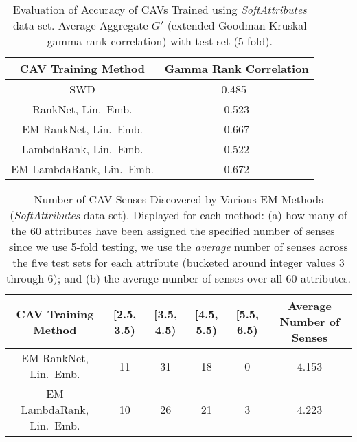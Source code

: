 \documentclass[manuscript,screen,nonacm]{acmart}
\newcommand{\1}{{\mathbf 1}}
\theoremstyle{TheoremNum}
\begin{document}
\begin{table}[t]
    \centering
\begin{tabular}{|c||c|}
\hline
CAV Training Method & Gamma Rank Correlation \\ \hline\hline
SWD & 0.485~\cite{sigir21:filipandkristian} \\ \hline     
RankNet, Lin.\ Emb. & 0.523 \\ \hline
EM RankNet, Lin.\ Emb. & 0.667 \\ \hline
LambdaRank, Lin.\ Emb. & 0.522 \\ \hline     
EM LambdaRank, Lin.\ Emb. & 0.672 \\ \hline     
\end{tabular}
\vspace*{2mm}
   \caption{Evaluation of Accuracy of CAVs Trained using \emph{SoftAttributes} data set. Average Aggregate $G'$ (extended Goodman-Kruskal gamma rank correlation) with test set (5-fold).}
   \label{tab:training_with_softattributes}
\end{table}

\begin{table}[t]
\begin{tabular}{|c||c|c|c|c|c|} \hline
CAV Training Method & [2.5, 3.5) & [3.5, 4.5) & [4.5, 5.5) & [5.5, 6.5) & Average Number of Senses \\ \hline\hline
EM RankNet, Lin.\ Emb. & 11 & 31 & 18 & 0 & 4.153 \\ \hline
EM LambdaRank, Lin.\ Emb. & 10 & 26 & 21 & 3 & 4.223 \\ \hline
\end{tabular}
\vspace*{2mm}
   \caption{Number of CAV Senses Discovered by Various EM Methods (\emph{SoftAttributes} data set). Displayed for each method: (a) how many of the 60 attributes have been assigned the specified number of senses---since we use 5-fold testing, we use the \emph{average} number of senses across the five test sets for each attribute (bucketed around integer values 3 through 6); and (b) the average number of senses over all 60 attributes.}
   \label{tab:sense_stats_softattributes}
\end{table}
\end{document}
